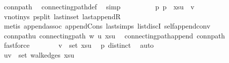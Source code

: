 \begin{isabellebody}
\ conn{\isacharunderscore}{\kern0pt}path\ \isamarkupfalse%
\ connecting{\isacharunderscore}{\kern0pt}path{\isacharunderscore}{\kern0pt}def\ \isamarkupfalse%
\ simp\isanewline
\ \ \ \ \ \ \isamarkupfalse%
\ \isamarkupfalse%
\ p{\isacharcolon}{\kern0pt}\ {\isachardoublequoteopen}p\ {\isacharequal}{\kern0pt}\ {\isacharparenleft}{\kern0pt}xs{\isacharat}{\kern0pt}{\isacharbrackleft}{\kern0pt}u{\isacharbrackright}{\kern0pt}{\isacharparenright}{\kern0pt}\ {\isacharat}{\kern0pt}\ {\isacharbrackleft}{\kern0pt}v{\isacharbrackright}{\kern0pt}{\isachardoublequoteclose}\ \isamarkupfalse%
\ v{\isacharunderscore}{\kern0pt}notin{\isacharunderscore}{\kern0pt}ys\ p{\isacharunderscore}{\kern0pt}split\ last{\isacharunderscore}{\kern0pt}in{\isacharunderscore}{\kern0pt}set\ last{\isacharunderscore}{\kern0pt}appendR\isanewline
\ \ \ \ \ \ \ \ \isamarkupfalse%
\ {\isacharparenleft}{\kern0pt}metis\ append{\isachardot}{\kern0pt}assoc\ append{\isacharunderscore}{\kern0pt}Cons\ last{\isachardot}{\kern0pt}simps\ list{\isachardot}{\kern0pt}discI\ self{\isacharunderscore}{\kern0pt}append{\isacharunderscore}{\kern0pt}conv{}{\isacharparenright}{\kern0pt}\isanewline
\ \ \ \ \ \ \isamarkupfalse%
\ \isamarkupfalse%
\ conn{\isacharunderscore}{\kern0pt}path{\isacharunderscore}{\kern0pt}u{\isacharcolon}{\kern0pt}\ {\isachardoublequoteopen}connecting{\isacharunderscore}{\kern0pt}path\ w\ u\ {\isacharparenleft}{\kern0pt}xs{\isacharat}{\kern0pt}{\isacharbrackleft}{\kern0pt}u{\isacharbrackright}{\kern0pt}{\isacharparenright}{\kern0pt}{\isachardoublequoteclose}\ \isamarkupfalse%
\ connecting{\isacharunderscore}{\kern0pt}path{\isacharunderscore}{\kern0pt}append\ conn{\isacharunderscore}{\kern0pt}path\ \isamarkupfalse%
\ fastforce\isanewline
\ \ \ \ \ \ \isamarkupfalse%
\ {\isachardoublequoteopen}v\ {\isasymnotin}\ set\ {\isacharparenleft}{\kern0pt}xs{\isacharat}{\kern0pt}{\isacharbrackleft}{\kern0pt}u{\isacharbrackright}{\kern0pt}{\isacharparenright}{\kern0pt}{\isachardoublequoteclose}\ \isamarkupfalse%
\ p\ distinct\ \isamarkupfalse%
\ auto\isanewline
\ \ \ \ \ \ \isamarkupfalse%
\ \isamarkupfalse%
\ {\isachardoublequoteopen}{\isacharbraceleft}{\kern0pt}u{\isacharcomma}{\kern0pt}v{\isacharbraceright}{\kern0pt}\ {\isasymnotin}\ set\ {\isacharparenleft}{\kern0pt}walk{\isacharunderscore}{\kern0pt}edges\ {\isacharparenleft}{\kern0pt}xs{\isacharat}{\kern0pt}{\isacharbrackleft}{\kern0pt}u{\isacharbrackright}{\kern0pt}{\isacharparenright}{\kern0pt}{\isacharparenright}{\kern0pt}{\isachardoublequoteclose}\ \isamarkupfalse%

\end{isabellebody}

